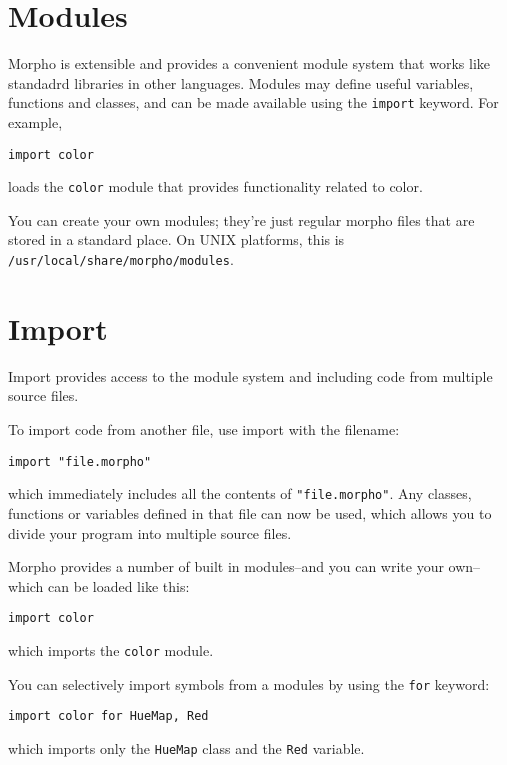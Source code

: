 \hypertarget{modules}{%
\section{Modules}\label{modules}}

Morpho is extensible and provides a convenient module system that works
like standadrd libraries in other languages. Modules may define useful
variables, functions and classes, and can be made available using the
\texttt{import} keyword. For example,

\begin{lstlisting}
import color
\end{lstlisting}

loads the \texttt{color} module that provides functionality related to
color.

You can create your own modules; they're just regular morpho files that
are stored in a standard place. On UNIX platforms, this is
\texttt{/usr/local/share/morpho/modules}.

\hypertarget{import}{%
\section{Import}\label{import}}

Import provides access to the module system and including code from
multiple source files.

To import code from another file, use import with the filename:

\begin{lstlisting}
import "file.morpho"
\end{lstlisting}

which immediately includes all the contents of \texttt{"file.morpho"}.
Any classes, functions or variables defined in that file can now be
used, which allows you to divide your program into multiple source
files.

Morpho provides a number of built in modules--and you can write your
own--which can be loaded like this:

\begin{lstlisting}
import color
\end{lstlisting}

which imports the \texttt{color} module.

You can selectively import symbols from a modules by using the
\texttt{for} keyword:

\begin{lstlisting}
import color for HueMap, Red
\end{lstlisting}

which imports only the \texttt{HueMap} class and the \texttt{Red}
variable.
